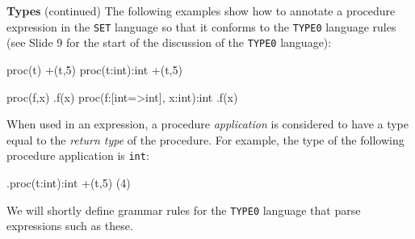 \begin{minipage}[t]{\sw}
\slidenumber
\LARGE
{\bf Types} (continued)\exx
The following examples show how to annotate a procedure expression
in the \verb'SET' language so that it conforms
to the \verb'TYPE0' language rules
(see Slide 9 for the start of the discussion
of the \verb'TYPE0' language):
\Large
\begin{qv}
proc(t) +(t,5)
proc(t:int):int +(t,5)

proc(f,x) .f(x)
proc(f:[int=>int], x:int):int .f(x)
\end{qv}
\LARGE
When used in an expression, a procedure {\em application}
is considered to have a type equal
to the {\em return type} of the procedure.
For example, the type
of the following procedure application is \verb'int':
\Large
\begin{qv}
.proc(t:int):int +(t,5) (4) %
\end{qv}
\LARGE
We will shortly define grammar rules
for the \verb'TYPE0' language that parse expressions
such as these.
\end{minipage}
